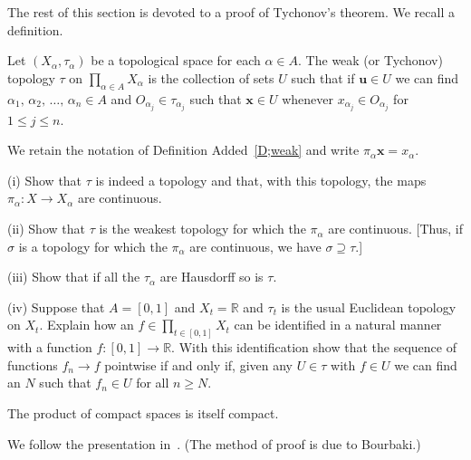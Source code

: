 The rest of this section is devoted to a proof of Tychonov's
theorem. We recall a definition.
\begin{added}[Definition]\label{D;weak} 
Let $(X_{\alpha},\tau_{\alpha})$
be a topological space for each $\alpha\in A$.
The weak (or Tychonov) topology $\tau$ on 
$\prod_{\alpha\in A}X_{\alpha}$ is the collection of sets
$U$ such that if ${\mathbf u}\in U$ we can find
$\alpha_{1},\,\alpha_{2},\,\dots,\,\alpha_{n}\in A$
and $O_{\alpha_{j}}\in\tau_{\alpha_{j}}$ such that
${\mathbf x}\in U$ whenever $x_{\alpha_{j}}\in O_{\alpha_{j}}$
for $1\leq j\leq n$.  
\end{added} 
\begin{added}[Exercise] We retain the notation of
Definition Added~\ref{D;weak} and write 
$\pi_{\alpha}{\mathbf x}=x_{\alpha}$.

(i) Show that $\tau$ is indeed a topology
and that, with this topology, the maps 
$\pi_{\alpha}:X\rightarrow X_{\alpha}$
are continuous. 

(ii) Show that $\tau$ is the weakest topology
for which the $\pi_{\alpha}$ are continuous.
[Thus, if $\sigma$ is a topology for which
the $\pi_{\alpha}$ are continuous, we have 
$\sigma\supseteq\tau$.]

(iii) Show that if all the $\tau_{\alpha}$ are Hausdorff
so is $\tau$. 

(iv) Suppose that $A=[0,1]$ and $X_{t}={\mathbb R}$
and $\tau_{t}$ is the usual Euclidean topology
on $X_{t}$. Explain how an $f\in\prod_{t\in[0,1]}X_{t}$
can be identified in a natural manner with a function
$f:[0,1]\rightarrow{\mathbb R}$. With this identification
show that the sequence of functions $f_{n}\rightarrow f$
pointwise if and only if, given any $U\in\tau$ with $f\in U$
we can find an $N$ such that $f_{n}\in U$ for all $n\geq N$.
\end{added}
\begin{theorem}[Tychonov] The product of compact
spaces is itself compact.
\end{theorem}
We follow the presentation in~\cite{Bollobas}.
(The method of proof is due to Bourbaki.)

